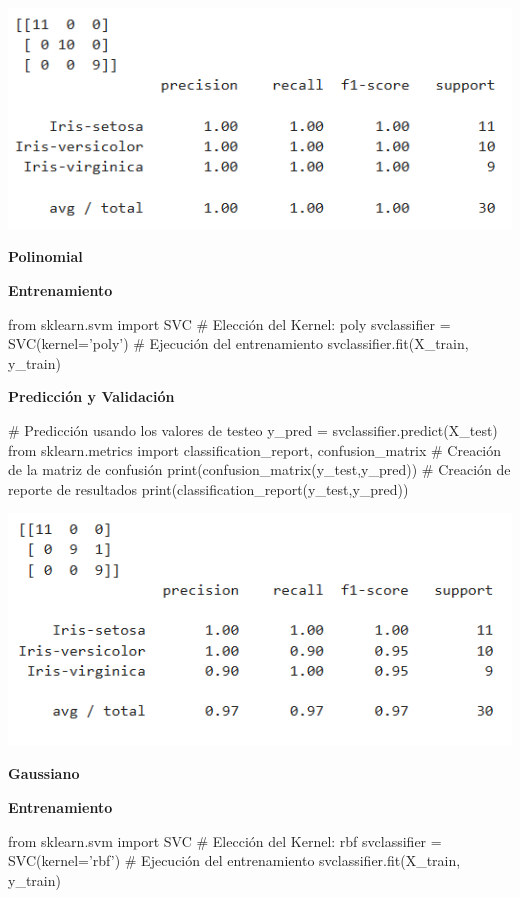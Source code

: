 \documentclass[paper=a4, fontsize=11pt]{scrartcl}
\numberwithin{equation}{section}		%
\numberwithin{figure}{section}			%
\numberwithin{table}{section}				%
\begin{document}
\begin{enumerate}
    \includegraphics[scale=0.8]{df2_results_linear}
    
    \textbf{Polinomial}
    
    \textbf{Entrenamiento}
    
    \begin{python}
    from sklearn.svm import SVC
    # Elección del Kernel: poly
    svclassifier = SVC(kernel='poly')
    # Ejecución del entrenamiento
    svclassifier.fit(X_train, y_train)
    \end{python}
    
    \textbf{Predicción y Validación}
    
    \begin{python}
    # Predicción usando los valores de testeo
    y_pred = svclassifier.predict(X_test)
    from sklearn.metrics import classification_report, confusion_matrix
    # Creación de la matriz de confusión
    print(confusion_matrix(y_test,y_pred))
    # Creación de reporte de resultados
    print(classification_report(y_test,y_pred))
    \end{python}
    
    \includegraphics[scale=0.8]{df2_results_poly}
    
    \textbf{Gaussiano}
    
    \textbf{Entrenamiento}
    
    \begin{python}
    from sklearn.svm import SVC
    # Elección del Kernel: rbf
    svclassifier = SVC(kernel='rbf')
    # Ejecución del entrenamiento
    svclassifier.fit(X_train, y_train)
    \end{python}
    

\end{enumerate}
\end{document}
